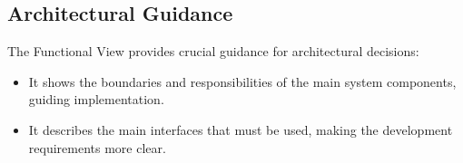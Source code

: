 \subsection{Architectural Guidance}

The Functional View provides crucial guidance for architectural decisions:

\begin{itemize}
    \item It shows the boundaries and responsibilities of the main system components, guiding implementation.
    \item It describes the main interfaces that must be used, making the development requirements more clear.
\end{itemize}


% 
